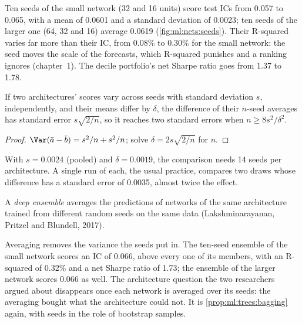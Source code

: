 Ten seeds of the small network (32 and 16 units) score test ICs from 0.057 to 0.065, with a mean of 0.0601 and a
standard deviation of 0.0023; ten seeds of the larger one (64, 32 and 16) average 0.0619 (\cref{fig:ml:nets:seeds}).
Their R-squared varies far more than their IC, from 0.08\% to 0.30\% for the small network: the seed moves the scale of
the forecasts, which R-squared punishes and a ranking ignores (chapter~1). The decile portfolio's net Sharpe ratio goes
from 1.37 to 1.78.

\begin{proposition}\label{prop:ml:nets:seeds}
If two architectures' scores vary across seeds with standard deviation $s$, independently, and their means differ by
$\delta$, the difference of their $n$-seed averages has standard error $s\sqrt{2/n}$, so it reaches two standard errors
when $n \ge 8s^2/\delta^2$.
\end{proposition}

\begin{proof}
$\Var(\bar a - \bar b) = s^2/n + s^2/n$; solve $\delta = 2s\sqrt{2/n}$ for $n$.
\end{proof}

With $s = 0.0024$ (pooled) and $\delta = 0.0019$, the comparison needs 14 seeds per architecture. A single run of each,
the usual practice, compares two draws whose difference has a standard error of 0.0035, almost twice the effect.

\begin{definition}\label{def:ml:neural-networks-for-noisy-tabular-data:ensemble}
A \emph{deep ensemble} averages the predictions of networks of the same architecture trained from
different random seeds on the same data (Lakshminarayanan, Pritzel and Blundell, 2017).
\end{definition}

Averaging removes the variance the seeds put in. The ten-seed ensemble of the small network scores an IC of 0.066, above
every one of its members, with an R-squared of 0.32\% and a net Sharpe ratio of 1.73; the ensemble of the larger
network scores 0.066 as well. The architecture question the two researchers argued about disappears once each network
is averaged over its seeds: the averaging bought what the architecture could not. It is \cref{prop:ml:trees:bagging}
again, with seeds in the role of bootstrap samples.

